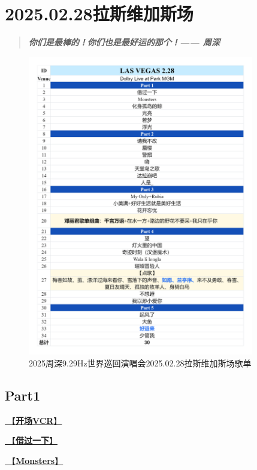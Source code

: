 \documentclass[]{ctexbook}
\begin{document}
\chapter{2025.02.28拉斯维加斯场}\label{LasVegas-20250228}

\begin{quote}
\textbf{\emph{你们是最棒的！你们也是最好运的那个！------ 周深}}
\end{quote}

\begin{figure}

{\centering \includegraphics[width=280pt]{img/playlists/playlists-lasvegas-20250228} 

}

\caption{2025周深9.29Hz世界巡回演唱会2025.02.28拉斯维加斯场歌单}\label{fig:unnamed-chunk-175}
\end{figure}

\newpage

\section{Part1}\label{LasVegas-20250228-part1}

\hyperref[opening-vcr]{🎥【\textbf{开场VCR}】}

\hyperref[I-will-go-my-way]{🎵【\textbf{借过一下}】}

\hyperref[Monsters]{🎵【\textbf{Monsters}】}
\end{document}
